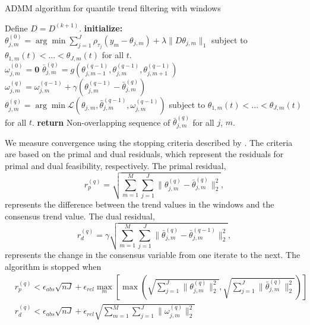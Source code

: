 \documentclass[12pt]{article}
\begin{document}
	\begin{algorithm}
		\caption{ADMM algorithm for quantile trend filtering with windows}\label{euclid}
		\begin{algorithmic}		
			\State Define $D = D^{(k+1)}$. 
			\State \textbf{initialize:} \\
				 $\theta_{j,m}^{(0)} = \arg \min \sum_{j=1}^J\rho_{\tau_j}(y_m - \theta_{j,m})+\lambda \lVert D\theta_{j,m}\rVert_1$ subject to $\theta_{1,m}(t) < ...<\theta_{J,m}(t)$ for all $t$. \\		
			 	 $\omega_{j,m}^{(0)} = \mathbf{0}$	
			\Repeat{}
			\State  		
			$\bar{\theta}_{j,m}^{(q)} = g(\theta_{j, m-1}^{(q-1)}, \theta_{j,m}^{(q-1)}, \theta_{j,m+1}^{(q-1)})$
			\State 
			$\omega_{j,m}^{(q)} = \omega_{j,m}^{(q-1)} + \gamma(\theta_{j,m}^{(q-1)} - \bar{\theta}_{j,m}^{(q)})$	
			\State
				$\theta_{j,m}^{(q)} = \arg\min \mathcal{L}(\theta_{j,m}, \bar{\theta}_{j,m}^{(q-1)}, \omega_{j,m}^{(q-1)})$			
			 subject to $\theta_{1,m}(t) < ...<\theta_{J,m}(t)$ for all $t$.
			\State \textbf{return} Non-overlapping sequence of $\bar{\theta}_{j,m}^{(q)}$ for all $j$, $m$.
			
		\end{algorithmic}
	\end{algorithm}

	We measure convergence using the stopping criteria described by \cite{boyd2011distributed}. The criteria are based on the primal and dual residuals, which represent the residuals for primal and dual feasibility, respectively. The primal residual, 
	\begin{equation}
	r_p^{(q)} = \sqrt{\sum_{m=1}^M\sum_{j=1}^J\lVert\theta_{j,m}^{(q)} - \bar{\theta}_{j,m}^{(q)}\rVert_2^2},
	\end{equation}
	represents the difference between the trend values in the windows and the consensus trend value. The dual residual,
	\begin{equation*}
	r_d^{(q)} = \gamma\sqrt{\sum_{m=1}^M \sum_{j=1}^J\lVert\bar{\theta}_{j,m}^{(q)} - \bar{\theta}_{j,m}^{(q-1)}\rVert_2^2},
	\end{equation*}
	represents the change in the consensus variable from one iterate to the next. The algorithm is stopped when 
	\begin{align}
		&r_p^{(q)} < \epsilon_{abs}\sqrt{nJ} + \epsilon_{rel}\underset{m}{\max}\left[\max 
		\left(\sqrt{\sum_{j=1}^J \lVert\theta_{j,m}^{(q)}\rVert_2^2}, \sqrt{\sum_{j=1}^J \lVert \bar{\theta}_{j,m}^{(q)} \rVert_2^2} \right )\right]\\
		&r_d^{(q)} < \epsilon_{abs}\sqrt{nJ} + \epsilon_{rel}\sqrt{\sum_{m=1}^M\sum_{j=1}^J\lVert \omega_{j,m}^{(q)}\rVert_2^2}
	\end{align}
	
\end{document}
